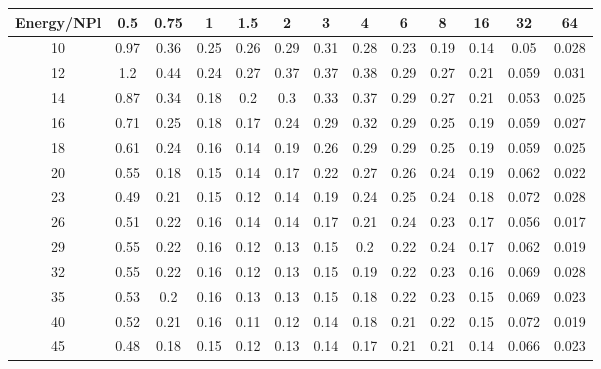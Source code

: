 \begin{tabular}{c c c c c c c c c c c c c}
\hline
\hline
 Energy/NPl &    0.5 &   0.75 &      1 &    1.5 &      2 &      3 &      4 &      6 &      8 &     16 &     32 &     64  \\ 
\hline
    10  &   0.97  &   0.36  &   0.25  &   0.26  &   0.29  &   0.31  &   0.28  &   0.23  &   0.19  &   0.14  &   0.05  &  0.028  \\
    12  &    1.2  &   0.44  &   0.24  &   0.27  &   0.37  &   0.37  &   0.38  &   0.29  &   0.27  &   0.21  &  0.059  &  0.031  \\
    14  &   0.87  &   0.34  &   0.18  &    0.2  &    0.3  &   0.33  &   0.37  &   0.29  &   0.27  &   0.21  &  0.053  &  0.025  \\
    16  &   0.71  &   0.25  &   0.18  &   0.17  &   0.24  &   0.29  &   0.32  &   0.29  &   0.25  &   0.19  &  0.059  &  0.027  \\
    18  &   0.61  &   0.24  &   0.16  &   0.14  &   0.19  &   0.26  &   0.29  &   0.29  &   0.25  &   0.19  &  0.059  &  0.025  \\
    20  &   0.55  &   0.18  &   0.15  &   0.14  &   0.17  &   0.22  &   0.27  &   0.26  &   0.24  &   0.19  &  0.062  &  0.022  \\
    23  &   0.49  &   0.21  &   0.15  &   0.12  &   0.14  &   0.19  &   0.24  &   0.25  &   0.24  &   0.18  &  0.072  &  0.028  \\
    26  &   0.51  &   0.22  &   0.16  &   0.14  &   0.14  &   0.17  &   0.21  &   0.24  &   0.23  &   0.17  &  0.056  &  0.017  \\
    29  &   0.55  &   0.22  &   0.16  &   0.12  &   0.13  &   0.15  &    0.2  &   0.22  &   0.24  &   0.17  &  0.062  &  0.019  \\
    32  &   0.55  &   0.22  &   0.16  &   0.12  &   0.13  &   0.15  &   0.19  &   0.22  &   0.23  &   0.16  &  0.069  &  0.028  \\
    35  &   0.53  &    0.2  &   0.16  &   0.13  &   0.13  &   0.15  &   0.18  &   0.22  &   0.23  &   0.15  &  0.069  &  0.023  \\
    40  &   0.52  &   0.21  &   0.16  &   0.11  &   0.12  &   0.14  &   0.18  &   0.21  &   0.22  &   0.15  &  0.072  &  0.019  \\
    45  &   0.48  &   0.18  &   0.15  &   0.12  &   0.13  &   0.14  &   0.17  &   0.21  &   0.21  &   0.14  &  0.066  &  0.023  \\
\hline
\hline
\end{tabular}
